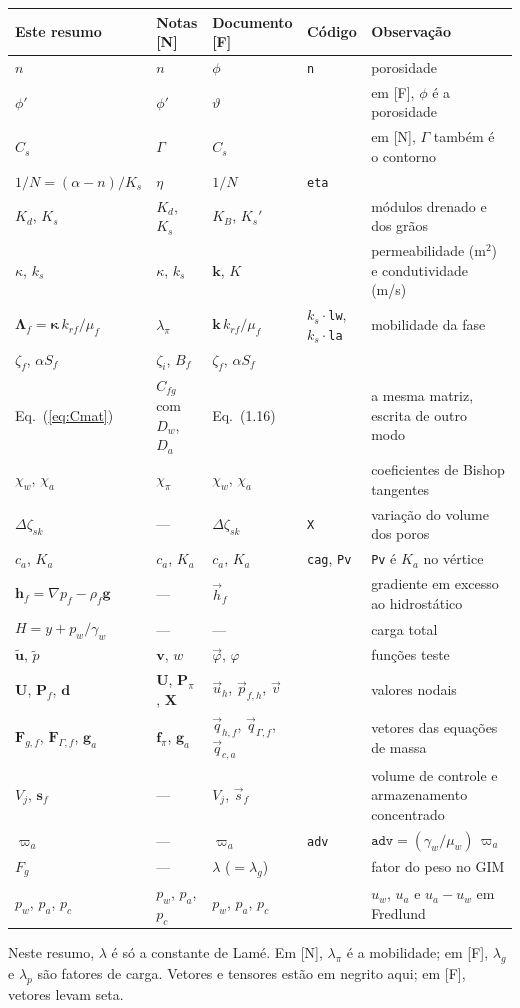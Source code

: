 \documentclass[11pt,a4paper]{article}
\newcommand{\vu}{\bm u}
\newcommand{\vg}{\bm g}
\newcommand{\tkap}{\bm\kappa}
\begin{document}
{\footnotesize
\begin{tabularx}{\textwidth}{@{}l l l l X@{}}
\toprule
Este resumo & Notas [N] & Documento [F] & Código & Observação\\
\midrule
$n$ & $n$ & $\phi$ & \texttt{n} & porosidade\\
$\phi'$ & $\phi'$ & $\vartheta$ & & em [F], $\phi$ é a porosidade\\
$C_s$ & $\Gamma$ & $C_s$ & & em [N], $\Gamma$ também é o contorno\\
$1/N=(\alpha-n)/K_s$ & $\eta$ & $1/N$ & \texttt{eta} & \\
$K_d$, $K_s$ & $K_d$, $K_s$ & $K_B$, $K_s'$ & & módulos drenado e dos grãos\\
$\kappa$, $k_s$ & $\kappa$, $k_s$ & $\bm k$, $K$ & & permeabilidade (m$^2$) e condutividade (m/s)\\
$\bm\Lambda_f=\tkap\,k_{rf}/\mu_f$ & $\lambda_\pi$ & $\bm k\,k_{rf}/\mu_f$ & $k_s\cdot$\texttt{lw}, $k_s\cdot$\texttt{la} & mobilidade da fase\\
$\zeta_f$, $\alpha S_f$ & $\zeta_i$, $B_f$ & $\zeta_f$, $\alpha S_f$ & & \\
Eq.~(\ref{eq:Cmat}) & $C_{fg}$ com $D_w$, $D_a$ & Eq.~(1.16) & & a mesma matriz, escrita de outro modo\\
$\chi_w$, $\chi_a$ & $\chi_\pi$ & $\chi_w$, $\chi_a$ & & coeficientes de Bishop tangentes\\
$\Delta\zeta_{sk}$ & --- & $\Delta\zeta_{sk}$ & \texttt{X} & variação do volume dos poros\\
$c_a$, $K_a$ & $c_a$, $K_a$ & $c_a$, $K_a$ & \texttt{cag}, \texttt{Pv} & \texttt{Pv} é $K_a$ no vértice\\
$\bm h_f=\nabla p_f-\rho_f\vg$ & --- & $\vec h_f$ & & gradiente em excesso ao hidrostático\\
$H=y+p_w/\gamma_w$ & --- & --- & & carga total\\
$\tilde{\vu}$, $\tilde p$ & $\bm v$, $w$ & $\vec\varphi$, $\varphi$ & & funções teste\\
$\mathbf U$, $\mathbf P_f$, $\mathbf d$ & $\mathbf U$, $\mathbf P_\pi$, $\mathbf X$ & $\vec u_h$, $\vec p_{f,h}$, $\vec v$ & & valores nodais\\
$\mathbf F_{g,f}$, $\mathbf F_{\Gamma,f}$, $\mathbf g_a$ & $\mathbf f_\pi$, $\mathbf g_a$ & $\vec q_{h,f}$, $\vec q_{\Gamma,f}$, $\vec q_{c,a}$ & & vetores das equações de massa\\
$V_j$, $\mathbf s_f$ & --- & $V_j$, $\vec s_f$ & & volume de controle e armazenamento concentrado\\
$\varpi_a$ & --- & $\varpi_a$ & \texttt{adv} & $\texttt{adv}=(\gamma_w/\mu_w)\,\varpi_a$\\
$F_g$ & --- & $\lambda$ ($=\lambda_g$) & & fator do peso no GIM\\
$p_w$, $p_a$, $p_c$ & $p_w$, $p_a$, $p_c$ & $p_w$, $p_a$, $p_c$ & & $u_w$, $u_a$ e $u_a-u_w$ em Fredlund\\
\bottomrule
\end{tabularx}
\par\smallskip
Neste resumo, $\lambda$ é só a constante de Lamé. Em [N], $\lambda_\pi$ é a mobilidade;
em [F], $\lambda_g$ e $\lambda_p$ são fatores de carga. Vetores e tensores estão em negrito
aqui; em [F], vetores levam seta.
}
\end{document}
